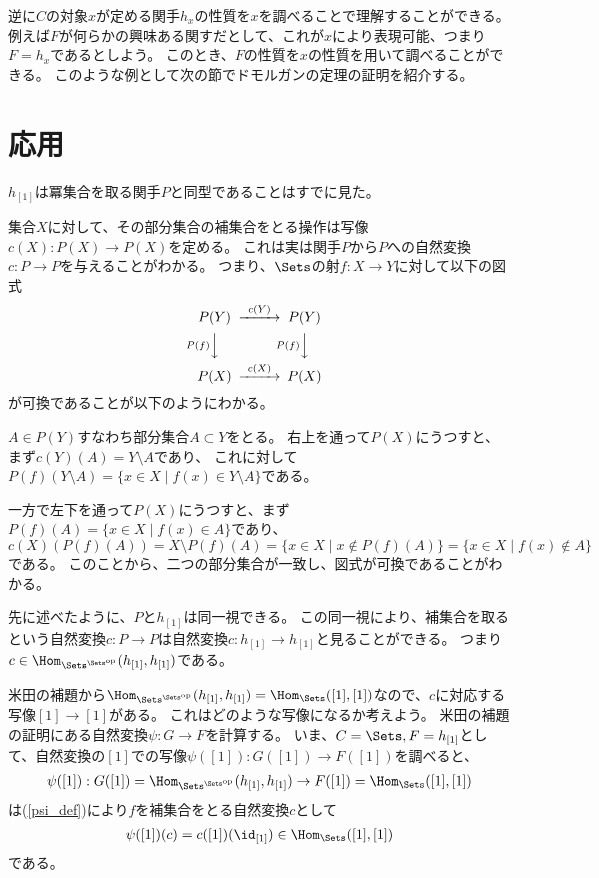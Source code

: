 \documentclass[uplatex]{jsarticle}
\begin{document}
逆に$C$の対象$x$が定める関手$h_x$の性質を$x$を調べることで理解することができる。
例えば$F$が何らかの興味ある関すだとして、これが$x$により表現可能、つまり$F=h_x$であるとしよう。
このとき、$F$の性質を$x$の性質を用いて調べることができる。
このような例として次の節でドモルガンの定理の証明を紹介する。

\newpage

\section{応用}
$h_{[1]}$は冪集合を取る関手$P$と同型であることはすでに見た。

集合$X$に対して、その部分集合の補集合をとる操作は写像$c(X):P(X)\to P(X)$を定める。
これは実は関手$P$から$P$への自然変換$c:P \to P$を与えることがわかる。
つまり、$\Sets$の射$f:X \to Y$に対して以下の図式
\begin{align*}
\begin{CD}
P(Y)@>c(Y)>>P(Y)\\
@VP(f)VV@VP(f)VV\\
P(X)@>c(X)>>P(X)
\end{CD}
\end{align*}
が可換であることが以下のようにわかる。

$A \in P(Y)$すなわち部分集合$A\subset Y$をとる。
右上を通って$P(X)$にうつすと、まず$c(Y)(A)=Y \setminus A$であり、
これに対して$P(f)(Y\setminus A)=\{x \in X \mid f(x) \in Y \setminus A\}$である。

一方で左下を通って$P(X)$にうつすと、まず$P(f)(A)=\{x \in X \mid f(x) \in A\}$であり、
$c(X)(P(f)(A))=X \setminus P(f)(A)=\{x \in X \mid x \notin P(f)(A)\}=\{x \in X \mid f(x) \notin A\} $である。
このことから、二つの部分集合が一致し、図式が可換であることがわかる。

\vspace{10pt}
先に述べたように、$P$と$h_{[1]}$は同一視できる。
この同一視により、補集合を取るという自然変換$c:P \to P$は自然変換$c:h_{[1]} \to h_{[1]}$と見ることができる。
つまり$c\in\Hom_{\Sets^{\Sets^{\rm op}}}(h_{[1]},h_{[1]})$である。

米田の補題から$\Hom_{\Sets^{\Sets^{\rm op}}}(h_{[1]},h_{[1]})=\Hom_{\Sets}([1],[1])$なので、$c$に対応する写像$[1]\to [1]$がある。
これはどのような写像になるか考えよう。
米田の補題の証明にある自然変換$\psi:G \to F$を計算する。
いま、$C=\Sets, F=h_{[1]}$として、自然変換の$[1]$での写像$\psi([1]):G([1]) \to F([1])$を調べると、
\begin{align*}
\psi([1]):G([1])=\Hom_{\Sets^{\Sets^{\rm op}}}(h_{[1]},h_{[1]}) \to F([1])=\Hom_{\Sets}([1],[1])
\end{align*}
は(\ref{psi_def})により$f$を補集合をとる自然変換$c$として
\begin{align*}
\psi([1])(c)=c([1])(\id_{[1]})\in\Hom_{\Sets}([1],[1])
\end{align*}
である。
\end{document}

